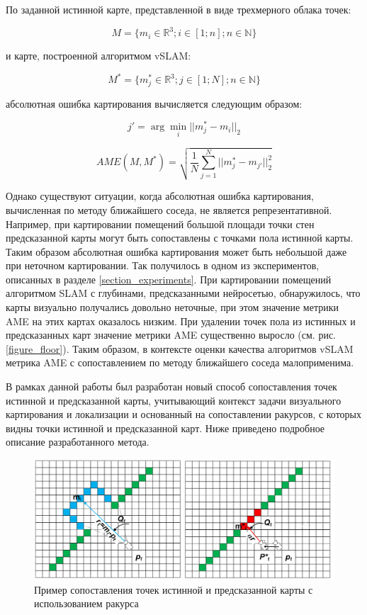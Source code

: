 \documentclass{mipt-thesis-ms}
\begin{document}
	По заданной истинной карте, представленной в виде трехмерного облака точек:
	
	\begin{equation}
	M=\{m_i \in \mathbb{R}^3; i \in [1;n]; n \in \mathbb{N}\}
	\label{eq_vslam_map}
	\end{equation}
	
	и карте, построенной алгоритмом vSLAM:
	
	\begin{equation}
	M^*=\{m^*_j \in \mathbb{R}^3; j \in [1;N]; n \in \mathbb{N}\}
	\label{eq_gt_map}
	\end{equation}
	
	абсолютная ошибка картирования вычисляется следующим образом:
	
	$$j' = \arg\min\limits_{i} ||m^*_j - m_{i}||_2$$
	
	\begin{equation}
		\label{eq_ame}		
		AME(M, M^*) = \sqrt{\frac{1}{N} \sum\limits_{j=1}^N ||m^*_j  - m_{j'}||_2^2}
	\end{equation}
	
	Однако существуют ситуации, когда абсолютная ошибка картирования, вычисленная по методу ближайшего соседа, не является репрезентативной. Например, при картировании помещений большой площади точки стен предсказанной карты могут быть сопоставлены с точками пола истинной карты. Таким образом абсолютная ошибка картирования может быть небольшой даже при неточном картировании. Так получилось в одном из экспериментов, описанных в разделе \ref{section_experiments}. При картировании помещений алгоритмом SLAM с глубинами, предсказанными нейросетью, обнаружилось, что карты визуально получались довольно неточные, при этом значение метрики AME на этих картах оказалось низким. При удалении точек пола из истинных и предсказанных карт значение метрики AME существенно выросло (см. рис. \ref{figure_floor}). Таким образом, в контексте оценки качества алгоритмов vSLAM метрика AME с сопоставлением по методу ближайшего соседа малоприменима.
	
	В рамках данной работы был разработан новый способ сопоставления точек истинной и предсказанной карты, учитывающий контекст задачи визуального картирования и локализации и основанный на сопоставлении ракурсов, с которых видны точки истинной и предсказанной карт. Ниже приведено подробное описание разработанного метода.
	
	\begin{figure}
		\includegraphics[width=1.0\textwidth]{img/corresp.png}
		\caption{Пример сопоставления точек истинной и предсказанной карты с использованием ракурса}
		\label{figure_correspondences}
	\end{figure}
	
\end{document}
